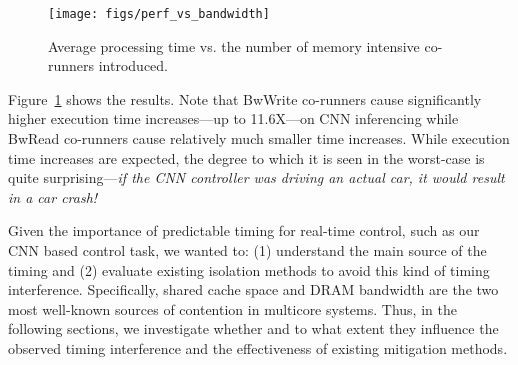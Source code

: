 \begin{figure}[h]
  \centering
  \texttt{[image: figs/perf\_vs\_bandwidth]}
  \caption{Average processing time vs. the number of memory
    intensive co-runners introduced.}
  \label{fig:perf_vs_bandwidth}
\end{figure}


Figure~\ref{fig:perf_vs_bandwidth} shows the results. Note
that BwWrite co-runners cause significantly higher execution time
increases---up to 11.6X---on CNN inferencing while BwRead co-runners
cause relatively much smaller time increases. While execution time
increases are expected, the degree to which it is seen in the worst-case 
is quite surprising---\emph{if the CNN controller was driving an actual
car, it would result in a car crash!}

Given the importance of predictable timing for real-time control, such
as our CNN based control task, we wanted to: (1) understand the main
source of the timing and (2) evaluate existing isolation methods to
avoid this kind of timing interference. Specifically, shared cache
space and DRAM bandwidth are the two most well-known sources of contention
in multicore systems. Thus, in the following sections, we investigate whether
and to what extent they influence the observed timing interference and
the effectiveness of existing mitigation methods.




